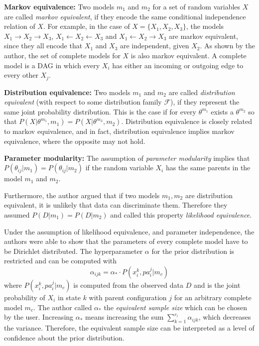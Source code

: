 \documentclass{article}
\begin{document}
	\textbf{Markov equivalence:}
	Two models $m_1$ and $m_2$ for a set of random variables $X$ are called \textit{markov equivalent},
	if they encode the same conditional independence relation of $X$. For example, in the case of
	$X=\{X_1,X_2,X_3\}$, the models $X_1 \rightarrow X_2 \rightarrow X_3$,
	$X_1 \leftarrow X_2 \leftarrow X_3$ and $X_1 \leftarrow X_2 \rightarrow X_3$ are 
	markov equivalent, since they all encode that $X_1$ and $X_3$ are independent, given $X_2$.
	As shown by the author, the set of complete models for $X$ is also markov equivalent. 
	A complete model is a DAG in which every $X_i$ has either an 	incoming or outgoing edge 
	to every other $X_j$.
	
	\textbf{Distribution equivalence:}
	Two models $m_1$ and $m_2$ are called \textit{distribution equivalent} (with respect to some distribution
	family $\mathcal{F}$), if they represent the same
	joint probability distribution. This is the case if for every $\theta^{m_1}$ exists a $\theta^{m_2}$
	so that $P(X|\theta^{m_1},m_1) = P(X|\theta^{m_2},m_2)$. Distribution equivalence is closely related
	to markov equivalence, and in fact, distribution equivalence implies markov equivalence, where the
	opposite may not hold.
	
	\textbf{Parameter modularity:}
	The assumption of \textit{parameter modularity} implies that $P(\theta_{ij}|m_1) = P(\theta_{ij}|m_2)$
	if the random variable $X_i$ has the same parents in the model $m_1$ and $m_2$.
	
	Furthermore, the author argued that if two models $m_1,m_2$ are distribution equivalent,
	it is unlikely that data can	discriminate them. Therefore they assumed $P(D|m_1)=P(D|m_2)$ and called this
	property \textit{likelihood equivalence}.
	
	Under the assumption of likelihood equivalence, and	parameter independence, the authors were able to
	show that the parameters of every complete model have to be Dirichlet distributed.	
	The hyperparameter $\alpha$ for the prior distribution is restricted and can be computed with
	\[
		\alpha_{ijk} = \alpha_* \cdot P(x_i^k, pa_i^j|m_c)
	\]
	where $P(x_i^k,pa_i^j|m_c)$ is computed from the observed data $D$ and is the joint probability
	of $X_i$ in state $k$ with parent configuration $j$ for
	an arbitrary complete model $m_c$. The author called $\alpha_*$
	the \textit{equivalent sample size} which can be chosen by the user. Increasing $\alpha_*$ means
	increasing the sum $\sum_{k=1}^{r_i} \alpha_{ijk}$, which decreases the variance. Therefore, the
	equivalent sample size can be interpreted as a level of confidence about the prior distribution.
	
\end{document}
